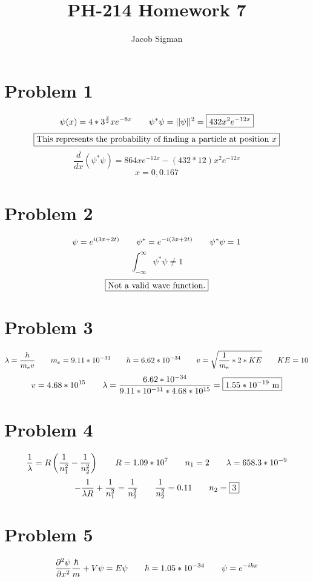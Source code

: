 \documentclass{article}
\title{PH-214 Homework 7}
\author{Jacob Sigman}
\date{}
\begin{document}
\maketitle
\section*{Problem 1}
\[\psi(x)=4*3^{\frac{3}{2}}xe^{-6x}\hspace{7 mm}\psi^{*}\psi=||\psi||^2=\boxed{432x^2e^{-12x}}\]
\[\boxed{\textnormal{This represents the probability of finding a particle at position }x}\]
\[\frac{d}{dx}(\psi^{*}\psi)=864xe^{-12x}-(432*12)x^2e^{-12x}\]
\[x=0,\boxed{0.167}\]
\section*{Problem 2}
\[\psi=e^{i(3x+2t)}\hspace{7 mm}\psi^{*}=e^{-i(3x+2t)}\hspace{7 mm}\psi^{*}\psi=1\]
\[\int_{-\infty}^{\infty}\psi^{*}\psi\neq 1\]
\[\boxed{\textnormal{Not a valid wave function.}}\]
\section*{Problem 3}
\[\lambda=\frac{h}{m_ev}\hspace{7 mm}m_e=9.11*10^{-31}\hspace{7 mm}h=6.62*10^{-34}\hspace{7 mm}v=\sqrt{\frac{1}{m_e}*2*KE}\hspace{7 mm}KE=10\]
\[v=4.68*10^{15}\hspace{7 mm}\lambda=\frac{6.62*10^{-34}}{9.11*10^{-31}*4.68*10^{15}}=\boxed{1.55*10^{-19}\textnormal{ m}}\]
\section*{Problem 4}
\[\frac{1}{\lambda}=R\left(\frac{1}{n_1^2}-\frac{1}{n_2^2}\right)\hspace{7 mm}R=1.09*10^7\hspace{7 mm}n_1=2\hspace{7 mm}\lambda=658.3*10^{-9}\]
\[-\frac{1}{\lambda R}+\frac{1}{n_1^2}=\frac{1}{n_2^2}\hspace{7 mm}\frac{1}{n_2^2}=0.11\hspace{7 mm}n_2=\boxed{3}\]
\section*{Problem 5}
\[\frac{\partial^2\psi}{\partial x^2}\frac{\hbar}{m}+V\psi=E\psi\hspace{7 mm}\hbar=1.05*10^{-34}\hspace{7 mm}\psi=e^{-ikx}\]
\end{document}
